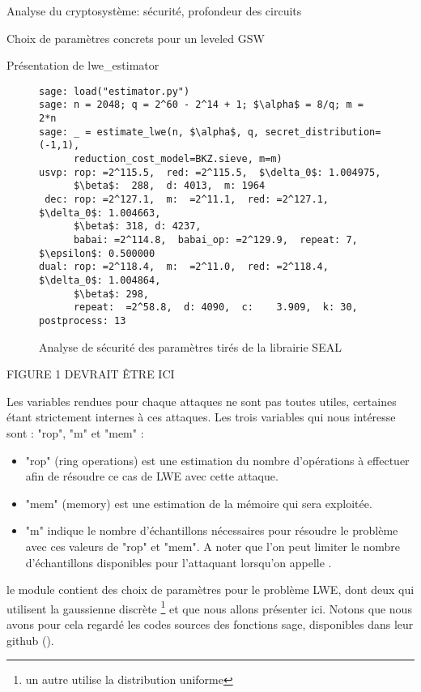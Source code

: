 \begin{section}{Analyse du cryptosystème: sécurité, profondeur des circuits}
\begin{subsection}{Choix de paramètres concrets pour un leveled GSW}
\begin{subsubsection}{Présentation de lwe\_estimator}
	\begin{figure}
	\label{fig:seal_estimate}
	\begin{lstlisting}[mathescape=true]
sage: load("estimator.py")
sage: n = 2048; q = 2^60 - 2^14 + 1; $\alpha$ = 8/q; m = 2*n
sage: _ = estimate_lwe(n, $\alpha$, q, secret_distribution=(-1,1), 
	  reduction_cost_model=BKZ.sieve, m=m)
usvp: rop: =2^115.5,  red: =2^115.5,  $\delta_0$: 1.004975,  
      $\beta$:  288,  d: 4013,  m: 1964
 dec: rop: =2^127.1,  m:  =2^11.1,  red: =2^127.1,  $\delta_0$: 1.004663,  
      $\beta$: 318, d: 4237,  
      babai: =2^114.8,  babai_op: =2^129.9,  repeat: 7,  $\epsilon$: 0.500000
dual: rop: =2^118.4,  m:  =2^11.0,  red: =2^118.4,  $\delta_0$: 1.004864,  
      $\beta$: 298,  
      repeat:  =2^58.8,  d: 4090,  c:    3.909,  k: 30, postprocess: 13
	\end{lstlisting}
	\caption{Analyse de sécurité des paramètres tirés de la librairie SEAL}
	\end{figure}
	FIGURE 1 DEVRAIT ÊTRE ICI \\
	\flushleft
	
	Les variables rendues pour chaque attaques ne sont pas toutes utiles, certaines étant strictement internes à ces attaques. Les trois variables qui nous intéresse sont : "rop", "m" et "mem" :
	
	\begin{itemize}
	\item "rop" (ring operations) est une estimation du nombre d'opérations à effectuer afin de résoudre ce cas de LWE avec cette attaque.
	
	\item "mem" (memory) est une estimation de la mémoire qui sera exploitée.
	
	\item "m" indique le nombre d'échantillons nécessaires pour résoudre le problème avec ces valeurs de
	"rop" et "mem". A noter que l'on peut limiter le nombre d'échantillons disponibles pour l'attaquant
	lorsqu'on appelle .
	\end{itemize}

	le module  contient des choix de paramètres pour
	le problème LWE, dont deux qui utilisent la gaussienne discrète
	\footnote{un autre utilise la distribution uniforme}
	et que nous allons présenter ici. Notons que nous avons pour cela 
	regardé les codes 
	sources des fonctions sage, disponibles dans leur github (\cite{sage}).
	\end{subsubsection}


\end{subsection}
\end{section}
